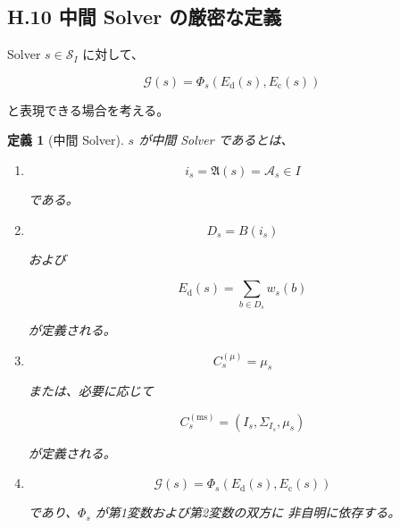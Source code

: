 \documentclass[a4paper,11pt]{article}
\newtheorem{definition}{定義}[section]
\newcommand{\Solver}{\mathcal{S}}
\newcommand{\Aset}{\mathcal{A}}
\newcommand{\Eval}{\mathcal{G}}
\begin{document}

\subsection{H.10 中間 Solver の厳密な定義}

Solver $s\in\Solver_I$ に対して、

\begin{equation}
    \Eval(s)
    =
    \Phi_s
    \left(
        E_{\mathrm d}(s),
        E_{\mathrm c}(s)
    \right)
\end{equation}

と表現できる場合を考える。

\begin{definition}[中間 Solver]
$s$ が中間 Solver であるとは、

\begin{enumerate}[label=\textup{(\arabic*)}]

\item

\begin{equation}
    i_s=\mathfrak{A}(s)=\Aset_s\in I
\end{equation}

である。

\item

\begin{equation}
    D_s=B(i_s)
\end{equation}

および

\begin{equation}
    E_{\mathrm d}(s)
    =
    \sum_{b\in D_s}w_s(b)
\end{equation}

が定義される。

\item

\begin{equation}
    C_s^{(\mu)}=\mu_s
\end{equation}

または、必要に応じて

\begin{equation}
    C_s^{(\mathrm{ms})}
    =
    (I_s,\Sigma_{I_s},\mu_s)
\end{equation}

が定義される。

\item

\begin{equation}
    \Eval(s)
    =
    \Phi_s
    \left(
        E_{\mathrm d}(s),
        E_{\mathrm c}(s)
    \right)
\end{equation}

であり、$\Phi_s$ が第1変数および第2変数の双方に
非自明に依存する。

\end{enumerate}
\end{definition}
\end{document}
